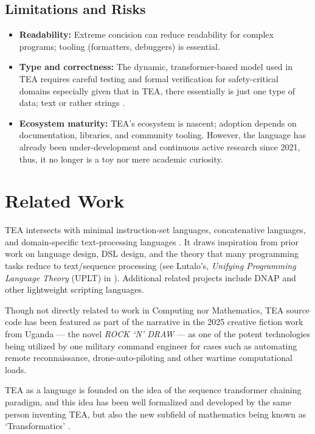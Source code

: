 \documentclass[acmtoplas]{acmart}
\begin{document}
\subsection{Limitations and Risks}
\begin{itemize}
  \item \textbf{Readability:} Extreme concision can reduce readability for complex programs; tooling (formatters, debuggers) is essential.
  \item \textbf{Type and correctness:} The dynamic, transformer-based model used in TEA requires careful testing and formal verification for safety-critical domains especially given that in TEA, there essentially is just one type of data; text or rather strings \cite{Lutalo2024TEATAZ}.
  \item \textbf{Ecosystem maturity:} TEA's ecosystem is nascent; adoption depends on documentation, libraries, and community tooling. However, the language has already been under-development and continuous active research since 2021, thus, it no longer is a toy nor mere academic curiosity.
\end{itemize}

\section{Related Work}
\label{SEC9}

TEA intersects with minimal instruction-set languages, concatenative languages, and domain-specific text-processing languages \cite{lutalo2024software}. It draws inspiration from prior work on language design\cite{coblenz2018interdisciplinary}, DSL design, and the theory that many programming tasks reduce to text/sequence processing (see Lutalo's, \textit{Unifying Programming Language Theory} (UPLT) in \cite{lutalo2024software}). Additional related projects include DNAP \cite{lutalodnapintro2020,lutalo2023dnapsoe} and other lightweight scripting languages.


Though not directly related to work in Computing nor Mathematics, TEA source code has been featured as part of the narrative in the 2025 creative fiction work from Uganda --- the novel \textit{ROCK `N' DRAW} \cite{lutalo2025rock} --- as one of the potent technologies being utilized by one military command engineer for cases such as automating remote reconnaissance, drone-auto-piloting and other wartime computational loads.


TEA as a language is founded on the idea of the sequence transformer chaining paradigm, and this idea has been well formalized and developed by the same person inventing TEA, but also the new subfield of mathematics being known as `Transformatics' \cite{Lutalo2025_transformatics_thesis, lutalo_2025_trans_genetics, Lutalo2025transpsy, lutalo_2025_grimlumtauto, lutalo_2025_trans101_1page, transformatics}.
\end{document}
